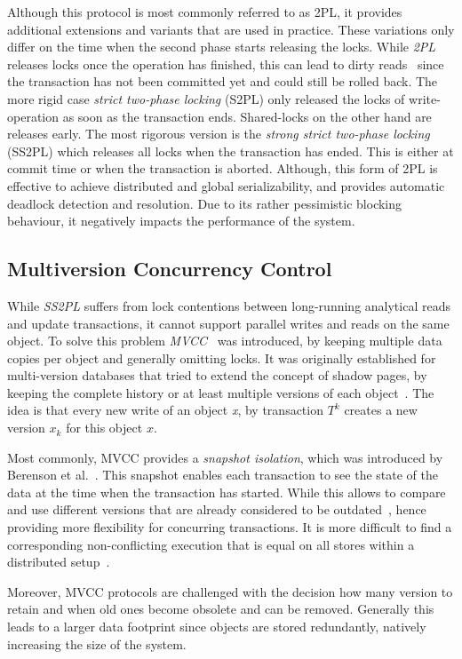 Although this protocol is most commonly referred to as 2PL, it provides additional extensions and variants that are used in practice. 
These variations only differ on the time when the second phase starts releasing the locks. 
While \emph{2PL} releases locks once the operation has finished, this can lead to dirty 
reads~\cite{weikum:2001} since the transaction has not been committed yet and could still be rolled back.
The more rigid case \emph{strict two-phase locking} (S2PL) only released the locks of write-operation as soon as the transaction ends.
Shared-locks on the other hand are releases early.
The most rigorous version is the \emph{strong strict two-phase locking} (SS2PL) which releases all locks when the transaction has ended.
This is either at commit time or when the transaction is aborted.
Although, this form of 2PL is effective to achieve distributed and global serializability, and provides automatic deadlock detection and resolution.
Due to its rather pessimistic blocking behaviour, it negatively impacts the performance of the system.



\subsection{Multiversion Concurrency Control}
While \emph{SS2PL} suffers from lock contentions between long-running analytical reads and update transactions, it cannot support parallel writes and reads on the same object. 
To solve this problem \emph{MVCC}~\cite{bernstein:1981} was introduced, by keeping multiple data copies per object and generally omitting locks.
It was originally established for multi-version databases that tried to extend the concept of shadow pages, by keeping the complete history or at least multiple versions 
of each object~\cite{bernstein:1982, bernstein:1983}.
The idea is that every new write of an object \emph{x}, by transaction $T^k$ creates a new version $x_k$ for this object $x$.

Most commonly, MVCC provides a \emph{snapshot isolation}, which was introduced by Berenson et al.~\cite{berenson:1995}.
This snapshot enables each transaction to see the state of the data at the time when the transaction has started.
While this allows to compare and use different versions that are already considered to be outdated~\cite{faleiro:2015}, 
hence providing more flexibility for concurring transactions. It is more difficult to find a corresponding non-conflicting 
execution that is equal on all stores within a distributed setup~\cite{fekete:2005, daudjee:2006}.

Moreover, MVCC protocols are challenged with the decision how many version to retain and when old ones become obsolete and can be removed. 
Generally this leads to a larger data footprint since objects are stored redundantly, natively increasing the size of the system. 
